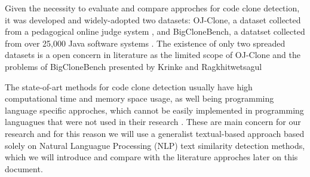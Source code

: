 Given the necessity to evaluate and compare approches for code clone detection, it was developed and widely-adopted two datasets: 
OJ-Clone, a dataset collected from a pedagogical online judge system \citep{ojclone}, and BigCloneBench, a datatset collected from over 
25,000 Java software systems \citep{bigclonebench}. The existence of only two spreaded datasets is a open concern in literature as 
the limited scope of OJ-Clone and the problems of BigCloneBench presented by Krinke and Ragkhitwetsagul \citep{bigfail}

The state-of-art methods for code clone detection usually have high computational time and memory space usage, as well being
programming language specific approches, which cannot be easily implemented in programming languagues that were not used in 
their research \citep{litreview}. These are main concern for our research and for this reason we will use a generalist textual-based 
approach based solely on Natural Languague Processing (NLP) text similarity detection methods, which we will introduce and compare
with the literature approches later on this document. 












